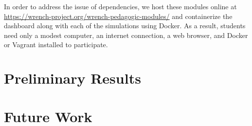 \documentclass{article}
\begin{document}
In order to address the issue of dependencies, we host these modules online at
\underline{https://wrench-project.org/wrench-pedagogic-modules/} and containerize the dashboard
along with each of the simulations using Docker. As a result, students need only a modest computer, an internet
connection, a web browser, and Docker or Vagrant installed to participate. 

\section{Preliminary Results}


\section{Future Work}



\end{document}
